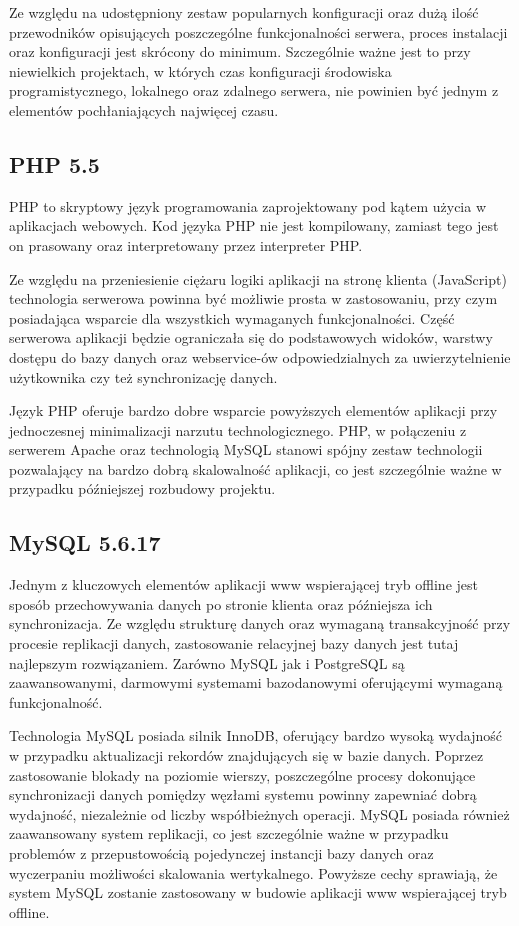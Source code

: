 Ze względu na udostępniony zestaw popularnych konfiguracji oraz dużą ilość przewodników opisujących poszczególne funkcjonalności serwera, proces instalacji oraz konfiguracji jest skrócony do minimum. Szczególnie ważne jest to przy niewielkich projektach, w których czas konfiguracji środowiska programistycznego, lokalnego oraz zdalnego serwera, nie powinien być jednym z elementów pochłaniających najwięcej czasu.

\subsection{PHP 5.5}
\label{sec:php}

PHP to skryptowy język programowania zaprojektowany pod kątem użycia w aplikacjach webowych. Kod języka PHP nie jest kompilowany, zamiast tego jest on prasowany oraz interpretowany przez interpreter PHP.

Ze względu na przeniesienie ciężaru logiki aplikacji na stronę klienta (JavaScript) technologia serwerowa powinna być możliwie prosta w zastosowaniu, przy czym posiadająca wsparcie dla wszystkich wymaganych funkcjonalności. Część serwerowa aplikacji będzie ograniczała się do podstawowych widoków, warstwy dostępu do bazy danych oraz webservice-ów odpowiedzialnych za uwierzytelnienie użytkownika czy też synchronizację danych.

Język PHP oferuje bardzo dobre wsparcie powyższych elementów aplikacji przy jednoczesnej minimalizacji narzutu technologicznego. PHP, w połączeniu z serwerem Apache oraz technologią MySQL stanowi spójny zestaw technologii pozwalający na bardzo dobrą skalowalność aplikacji, co jest szczególnie ważne w przypadku późniejszej rozbudowy projektu.

\subsection{MySQL 5.6.17}
\label{sec:mysql}

Jednym z kluczowych elementów aplikacji www wspierającej tryb offline jest sposób przechowywania danych po stronie klienta oraz późniejsza ich synchronizacja. Ze względu strukturę danych oraz wymaganą transakcyjność przy procesie replikacji danych, zastosowanie relacyjnej bazy danych jest tutaj najlepszym rozwiązaniem. Zarówno MySQL jak i PostgreSQL są zaawansowanymi, darmowymi systemami bazodanowymi oferującymi wymaganą funkcjonalność.

Technologia MySQL posiada silnik InnoDB, oferujący bardzo wysoką wydajność w przypadku aktualizacji rekordów znajdujących się w bazie danych. Poprzez zastosowanie blokady na poziomie wierszy, poszczególne procesy dokonujące synchronizacji danych pomiędzy węzłami systemu powinny zapewniać dobrą wydajność, niezależnie od liczby współbieżnych operacji. MySQL posiada również zaawansowany system replikacji, co jest szczególnie ważne w przypadku problemów z przepustowością pojedynczej instancji bazy danych oraz wyczerpaniu możliwości skalowania wertykalnego. Powyższe cechy sprawiają, że system MySQL zostanie zastosowany w budowie aplikacji www wspierającej tryb offline.